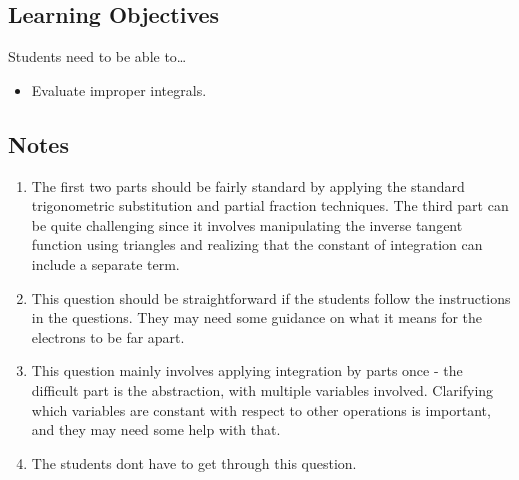 \subsection*{Learning Objectives}
Students need to be able to\ldots
\begin{itemize}
	\item Evaluate improper integrals.
\end{itemize}

\subsection*{Notes}
	\begin{enumerate}
			\item The first two parts should be fairly standard by applying the standard trigonometric substitution and partial fraction techniques. The third part can be quite challenging since it involves manipulating the inverse tangent function using triangles and realizing that the constant of integration can include a separate term.

            \item This question should be straightforward if the students follow the instructions in the questions. They may need some guidance on what it means for the electrons to be far apart.

            \item This question mainly involves applying integration by parts once - the difficult part is the abstraction, with multiple variables involved. Clarifying which variables are constant with respect to other operations is important, and they may need some help with that. 

            \item The students dont have to get through this question. 
	\end{enumerate}